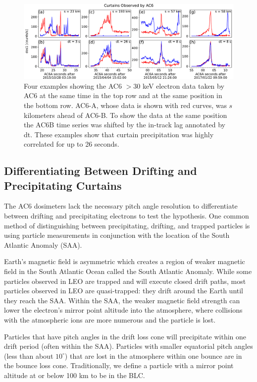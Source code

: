 \documentclass[draft]{agujournal2019}
\begin{document}
\begin{figure}
\includegraphics[width=\textwidth]{fig1.pdf}
\caption{Four examples showing the AC6 $> 30$ keV electron data taken by AC6 at the same time in the top row and at the same position in the bottom row. AC6-A, whose data is shown with red curves, was $s$ kilometers ahead of AC6-B. To show the data at the same position the AC6B time series was shifted by the in-track lag annotated by dt. These examples show that curtain precipitation was highly correlated for up to 26 seconds.}
\label{fig1}
\end{figure}

\subsection{Differentiating Between Drifting and Precipitating Curtains}

The AC6 dosimeters lack the necessary pitch angle resolution to differentiate between drifting and precipitating electrons to test the  hypothesis. One common method of distinguishing between precipitating, drifting, and trapped particles is using particle measurements in conjunction with the location of the South Atlantic Anomaly (SAA).

Earth's magnetic field is asymmetric which creates a region of weaker magnetic field in the South Atlantic Ocean called the South Atlantic Anomaly. 
While some particles observed in LEO are trapped and will execute closed drift paths, most particles observed in LEO are quasi-trapped: they drift around the Earth until they reach the SAA. Within the SAA, the weaker magnetic field strength can lower the electron's mirror point altitude into the atmosphere, where collisions with the atmospheric ions are more numerous and the particle is lost. 

Particles that have pitch angles in the drift loss cone will precipitate within one drift period (often within the SAA). Particles with smaller equatorial pitch angles (less than about $10^\circ$) that are lost in the atmosphere within one bounce are in the bounce loss cone. Traditionally, we define a particle with a mirror point altitude at or below 100 km to be in the BLC.
\end{document}
